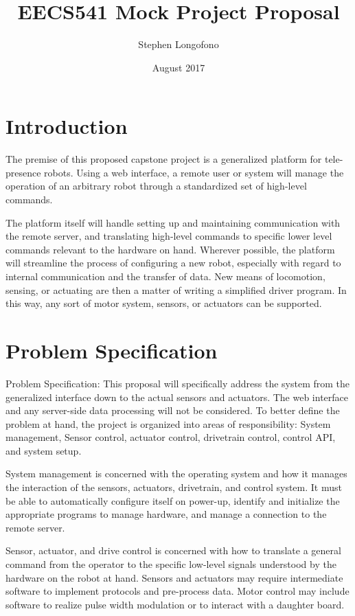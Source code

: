 \documentclass{article}
\title{EECS541 Mock Project Proposal}
\author{Stephen Longofono}
\date{August 2017}
\begin{document}
\maketitle

\section{Introduction}
The premise of this proposed capstone project is a generalized platform for tele-presence robots.  Using a web interface, a remote user or system will manage the operation of an arbitrary robot through a standardized set of high-level commands.

The platform itself will handle setting up and maintaining communication with the remote server, and translating high-level commands to specific lower level commands relevant to the hardware on hand.  Wherever possible, the platform will streamline the process of configuring a new robot, especially with regard to internal communication and the transfer of data.  New means of locomotion, sensing, or actuating are then a matter of writing a simplified driver program.  In this way, any sort of motor system, sensors, or actuators can be supported.

\section{Problem Specification}
Problem Specification:
This proposal will specifically address the system from the generalized interface down to the actual sensors and actuators.  The web interface and any server-side data processing will not be considered.  To better define the problem at hand, the project is organized into areas of responsibility: System management, Sensor control, actuator control, drivetrain control, control API, and system setup.

System management is concerned with the operating system and how it manages the interaction of the sensors, actuators, drivetrain, and control system.  It must be able to automatically configure itself on power-up, identify and initialize the appropriate programs to manage hardware, and manage a connection to the remote server.

Sensor, actuator, and drive control is concerned with how to translate a general command from the operator to the specific low-level signals understood by the hardware on the robot at hand.  Sensors and actuators may require intermediate software to implement protocols and pre-process data.  Motor control may include software to realize pulse width modulation or to interact with a daughter board.
\end{document}
